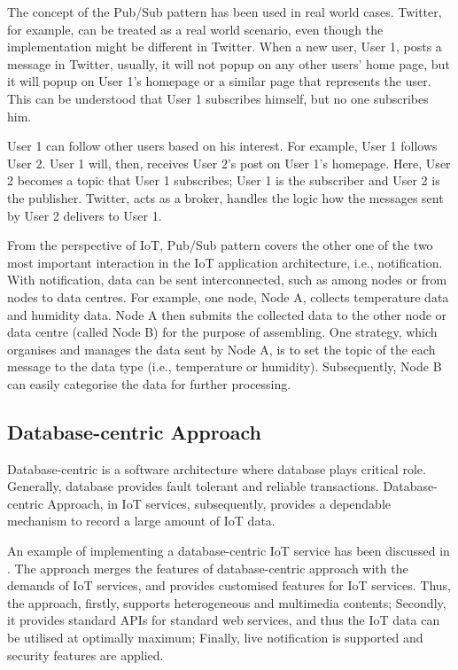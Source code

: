 The concept of the Pub/Sub pattern has been used in real world cases. Twitter, for example, can be treated as a real world scenario, even though the implementation might be different in Twitter. When a new user, User 1, posts a message in Twitter, usually, it will not popup on any other users' home page, but it will popup on User 1's homepage or a similar page that represents the user. This can be understood that User 1 subscribes himself, but no one subscribes him. 

User 1 can follow other users based on his interest. For example, User 1 follows User 2. User 1 will, then, receives User 2's post on User 1's homepage. Here, User 2 becomes a topic that User 1 subscribes; User 1 is the subscriber and User 2 is the publisher. Twitter, acts as a broker, handles the logic how the messages sent by User 2 delivers to User 1.

From the perspective of IoT, Pub/Sub pattern covers the other one of the two most important interaction in the IoT application architecture, i.e., notification. With notification, data can be sent interconnected, such as among nodes or from nodes to data centres. For example, one node, Node A, collects temperature data and humidity data. Node A then submits the collected data to the other node or data centre (called Node B) for the purpose of assembling. One strategy, which organises and manages the data sent by Node A, is to set the topic of the each message to the data type (i.e., temperature or humidity). Subsequently, Node B can easily categorise the data for further processing.

\subsection{Database-centric Approach}

Database-centric is a software architecture where database plays critical role. Generally, database provides fault tolerant and reliable transactions. Database-centric Approach, in IoT services, subsequently, provides a dependable mechanism to record a large amount of IoT data. 

An example of implementing a database-centric IoT service has been discussed in \cite{francesco2012storage}. The approach merges the features of database-centric approach with the demands of IoT services, and provides customised features for IoT services. Thus, the approach, firstly, supports heterogeneous and multimedia contents; Secondly, it provides standard APIs for standard web services, and thus the IoT data can be utilised at optimally maximum; Finally, live notification is supported and security features are applied.

